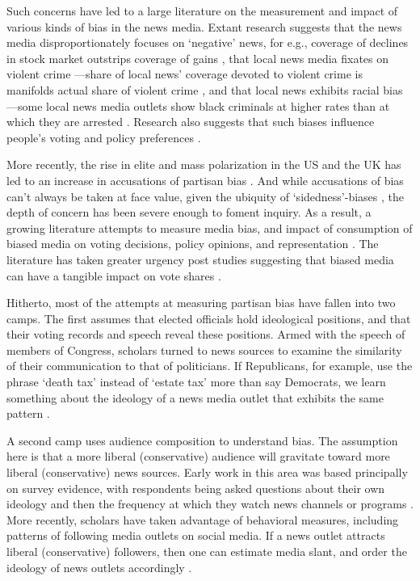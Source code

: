 \documentclass[12pt, letterpaper]{article}
\begin{document}
Such concerns have led to a large literature on the measurement and impact of various kinds of bias in the news media. Extant research suggests that the news media disproportionately focuses on `negative' news, for e.g., coverage of declines in stock market outstrips coverage of gains \citep{goetzmann2016crash}, that local news media fixates on violent crime ---share of local news' coverage devoted to violent crime is manifolds actual share of violent crime \citep{gross2006covering}, and that local news exhibits racial bias---some local news media outlets show black criminals at higher rates than at which they are arrested \citep{dixon2000overrepresentation}. Research also suggests that such biases influence people's voting and policy preferences \citep[see, for e.g.,]{gilens2009americans, gilliam2000prime}.

More recently, the rise in elite and mass polarization in the US and the UK \citep{mccarty2016polarized, iyengar2012} has led to an increase in accusations of partisan bias \citep{ladd2011}. And while accusations of bias can't always be taken at face value, given the ubiquity of `sidedness'-biases \citep{vallone1985hostile}, the depth of concern has been severe enough to foment inquiry. As a result, a growing literature attempts to measure media bias, and impact of consumption of biased media on voting decisions, policy opinions, and representation \citep[see, for e.g.,][]{groseclose2005, gentzkow2010, dellavigna2007}. The literature has taken greater urgency post studies suggesting that biased media can have a tangible impact on vote shares \citep{dellavigna2007, martin2014}.

Hitherto, most of the attempts at measuring partisan bias have fallen into two camps. The first assumes that elected officials hold ideological positions, and that their voting records and speech reveal these positions. Armed with the speech of members of Congress, scholars turned to news sources to examine the similarity of their communication to that of politicians. If Republicans, for example, use the phrase `death tax' instead of `estate tax' more than say Democrats, we learn something about the ideology of a news media outlet that exhibits the same pattern \citep[e.g.,][]{gentzkow2010,groseclose2005}.

A second camp uses audience composition to understand bias. The assumption here is that a more liberal (conservative) audience will gravitate toward more liberal (conservative) news sources. Early work in this area was based principally on survey evidence, with respondents being asked questions about their own ideology and then the frequency at which they watch news channels or programs \citep[see][for a recent example]{stroud2011}. More recently, scholars have taken advantage of behavioral measures, including patterns of following media outlets on social media. If a news outlet attracts liberal (conservative) followers, then one can estimate media slant, and order the ideology of news outlets accordingly \citep{gentzkow2011, barbera2016}.
\end{document}
